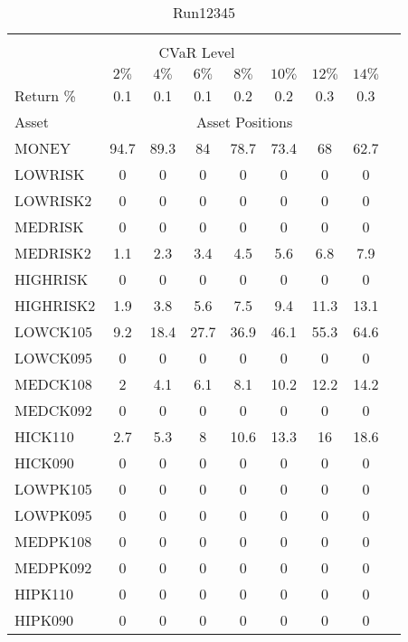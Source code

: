 \begin{table}[h!t]
\caption{Run12345}
\centering
\begin{tabular}[t]{ l c c c c c c c c }
\hline\hline \\
\multicolumn{8}{c}{CVaR Level} \\
 & $2\%$ & $4\%$ & $6\%$ & $8\%$ & $10\%$ & $12\%$ & $14\%$ \\[0.5ex]
Return \% &0.1 &0.1 &0.1 &0.2 &0.2 &0.3 &0.3\\[0.5ex]
Asset & \multicolumn{7}{c}{Asset Positions} \\[1ex]
MONEY & 94.7 & 89.3 & 84 & 78.7 & 73.4 & 68 & 62.7\\
LOWRISK & 0 & 0 & 0 & 0 & 0 & 0 & 0\\
LOWRISK2 & 0 & 0 & 0 & 0 & 0 & 0 & 0\\
MEDRISK & 0 & 0 & 0 & 0 & 0 & 0 & 0\\
MEDRISK2 & 1.1 & 2.3 & 3.4 & 4.5 & 5.6 & 6.8 & 7.9\\
HIGHRISK & 0 & 0 & 0 & 0 & 0 & 0 & 0\\
HIGHRISK2 & 1.9 & 3.8 & 5.6 & 7.5 & 9.4 & 11.3 & 13.1\\
LOWCK105 & 9.2 & 18.4 & 27.7 & 36.9 & 46.1 & 55.3 & 64.6\\
LOWCK095 & 0 & 0 & 0 & 0 & 0 & 0 & 0\\
MEDCK108 & 2 & 4.1 & 6.1 & 8.1 & 10.2 & 12.2 & 14.2\\
MEDCK092 & 0 & 0 & 0 & 0 & 0 & 0 & 0\\
HICK110 & 2.7 & 5.3 & 8 & 10.6 & 13.3 & 16 & 18.6\\
HICK090 & 0 & 0 & 0 & 0 & 0 & 0 & 0\\
LOWPK105 & 0 & 0 & 0 & 0 & 0 & 0 & 0\\
LOWPK095 & 0 & 0 & 0 & 0 & 0 & 0 & 0\\
MEDPK108 & 0 & 0 & 0 & 0 & 0 & 0 & 0\\
MEDPK092 & 0 & 0 & 0 & 0 & 0 & 0 & 0\\
HIPK110 & 0 & 0 & 0 & 0 & 0 & 0 & 0\\
HIPK090 & 0 & 0 & 0 & 0 & 0 & 0 & 0\\
[1ex] \hline
\end{tabular}
\end{table} 